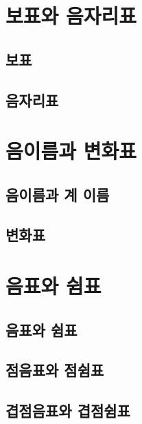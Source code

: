 \documentclass[12pt, a4paper, oneside]{book}
\let\stdsection\section
\renewcommand\section{\newpage\stdsection}
\begin{document}
%
	\section{보표와 음자리표}

	\subsection{보표}

	\subsection{음자리표}


%
	\section{음이름과 변화표}

	\subsection{음이름과 계 이름}

	\subsection{변화표}


%
	\section{음표와 쉼표}

	\subsection{음표와 쉼표}

	\subsection{점음표와 점쉼표}

	\subsection{겹점음표와 겹점쉼표}
\end{document}
